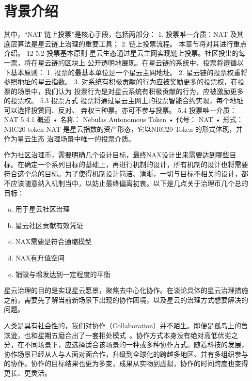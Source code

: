 \section{背景介绍}

其中，“NAT 链上投票”是核心手段，包括两部分：
1. 投票唯一介质：NAT 及其底层算法是星云链上治理的重要工具；
2. 链上投票流程。
本章节将对其进行重点介绍。
12
5.2 投票基本原则
星云生态通过星云主网实现链上投票。社区投出的每一票，将在星云链的区块上
公开透明地展现。在星云链的系统中，投票将遵循以下基本原则：
1. 投票的最基本单位是一个星云主网地址。
2. 星云链的投票权重将参照地址的星云指数。
3. 对系统有积极贡献的行为应被奖励更多的投票权，在投票的场景中，我们认为
投票行为是对星云系统有积极贡献的行为，应被激励更多的投票权。
5.3 投票方式
投票将通过星云主网上的投票智能合约实现，每个地址可以选择投赞同、反对、
弃权三种票。亦可不参与投票。
5.4 投票唯一介质：NAT
5.4.1 概述
• 名称： Nebulas Autonomous Token
• 代号： NAT
• 形式： NRC20 token
NAT 是星云指数的资产形态，它以NRC20 Token 的形式体现，并作为星云生态
治理场景中唯一的投票介质。


作为社区治理币，需要明确几个设计目标，最终NAX设计出来需要达到哪些目标。在确定一个系列目标的基础上，再进行机制的设计，所有机制的设计也将需要符合这个总的目标。为了使得机制设计简洁、清晰，一切与目标不相关的设计，都不应该随意纳入机制当中，以妨止最终偏离初衷。以下是几点关于治理币几个总的目标：

\begin{enumerate}[a.]
        \item 用于星云社区治理
        \item 星云社区贡献有效凭证
        \item NAX需要是符合通缩模型
        \item NAX有升值空间
        \item 销毁与增发达到一定程度的平衡
\end{enumerate}

星云治理的目的是实现星云愿景，聚焦去中心化协作。在谈论具体的星云治理措施之前，需要先了解当前新场景下出现的协作困境，以及星云的治理方式想要解决的问题。

\label{background}

人类是具有社会性的，我们对协作（Collaboration）并不陌生。即便是孤岛上的鲁滨逊，也和星期五磨合出了一套相处模式~\cite{robinson}。协作方式本身没有绝对高低优劣之分，在不同场景下，应选择适合该场景的一种或多种协作方式。随着科技的发展，协作场景已经从人与人面对面合作，升级到全球化的跨越多地区、并有多组织参与的协作。协作的目标结果也更为多变，成果从实物到虚拟，协作的时间跨度也变得更长、更灵活。

